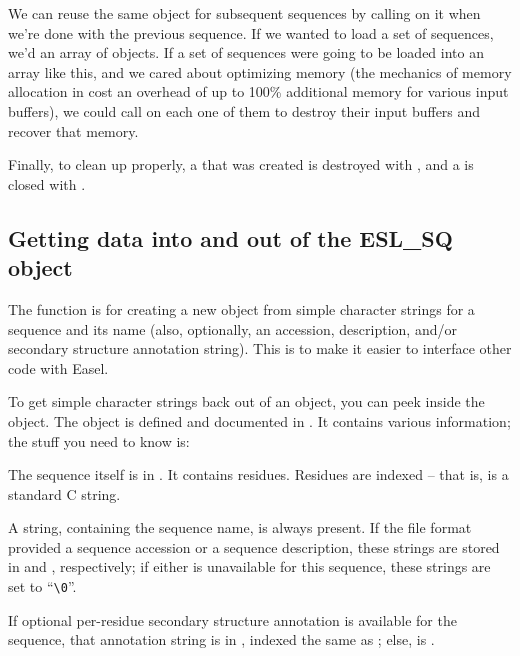 We can reuse the same  object for subsequent sequences
by calling  on it when we're done with the
previous sequence. If we wanted to load a set of sequences, we'd
 an array of  objects. If a set of
sequences were going to be loaded into an array like this, and we
cared about optimizing memory (the mechanics of memory allocation in
 cost an overhead of up to 100\% additional
memory for various input buffers), we could call
 on each one of them to destroy their input
buffers and recover that memory.

Finally, to clean up properly, a  that was created is
destroyed with , and a 
is closed with .

\subsection{Getting data into and out of the ESL\_SQ object}

The  function is for creating a new
 object from simple character strings for a sequence
and its name (also, optionally, an accession, description, and/or
secondary structure annotation string). This is to make it easier to
interface other code with Easel.

To get simple character strings back out of an  object,
you can peek inside the object. The object is defined and documented
in . It contains various information; the stuff you
need to know is:



The sequence itself is in . It contains 
residues. Residues are indexed  -- that is, 
is a standard C string. 

A  string, containing the sequence name, is always
present. If the file format provided a sequence accession or a
sequence description, these strings are stored in  and
, respectively; if either is unavailable for this
sequence, these strings are set to ``\verb+\0+''.

If optional per-residue secondary structure annotation is available
for the sequence, that annotation string is in , indexed the
same as ; else,  is .

